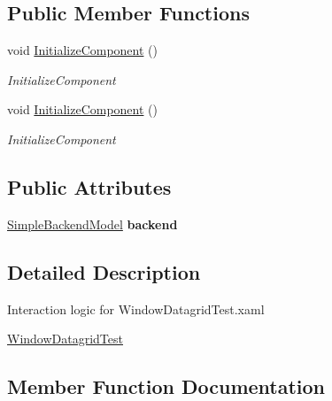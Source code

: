 \subsection*{Public Member Functions}
\begin{DoxyCompactItemize}
\item 
void \hyperlink{class_power_system_planning_wpf_app_1_1_control_utils_1_1_window_datagrid_test_a2ee573ee48c61c75d4817d43672b76b9}{Initialize\+Component} ()
\begin{DoxyCompactList}\small\item\em Initialize\+Component \end{DoxyCompactList}\item 
void \hyperlink{class_power_system_planning_wpf_app_1_1_control_utils_1_1_window_datagrid_test_a2ee573ee48c61c75d4817d43672b76b9}{Initialize\+Component} ()
\begin{DoxyCompactList}\small\item\em Initialize\+Component \end{DoxyCompactList}\end{DoxyCompactItemize}
\subsection*{Public Attributes}
\begin{DoxyCompactItemize}
\item 
\hyperlink{class_power_system_planning_wpf_app_1_1_control_utils_1_1_simple_backend_model}{Simple\+Backend\+Model} {\bfseries backend}\hypertarget{class_power_system_planning_wpf_app_1_1_control_utils_1_1_window_datagrid_test_a40b06d8fcd3574e8bdbfdd49086c0329}{}\label{class_power_system_planning_wpf_app_1_1_control_utils_1_1_window_datagrid_test_a40b06d8fcd3574e8bdbfdd49086c0329}

\end{DoxyCompactItemize}


\subsection{Detailed Description}
Interaction logic for Window\+Datagrid\+Test.\+xaml 

\hyperlink{class_power_system_planning_wpf_app_1_1_control_utils_1_1_window_datagrid_test}{Window\+Datagrid\+Test} 

\subsection{Member Function Documentation}
